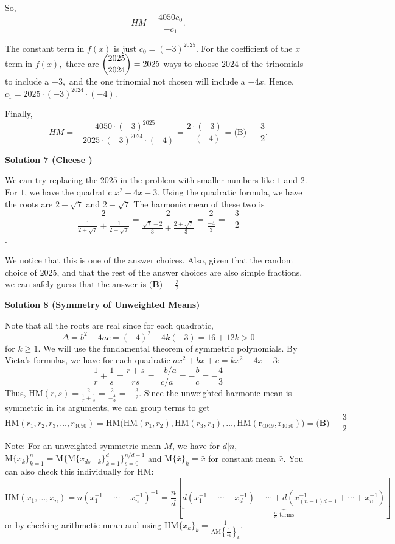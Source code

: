 \begin{enumerate}
 So, 
 \[HM = \dfrac{4050c_0}{-c_1}.\]

 The constant term in $f(x)$ is just $c_0=(-3)^{2025}.$ For the coefficient of the $x$ term in $f(x),$ there are $\dbinom{2025}{2024}=2025$ ways to choose $2024$ of the trinomials to include a $-3,$ and the one trinomial not chosen will include a $-4x.$ Hence, $c_1=2025\cdot (-3)^{2024}\cdot (-4).$

 Finally, 
 \[HM=\dfrac{4050\cdot(-3)^{2025}}{-2025\cdot (-3)^{2024}\cdot (-4)}=\dfrac{2\cdot(-3)}{-(-4)}=\boxed{\text{(B) }-\dfrac{3}{2}}.\]




\textbf{Solution 7 (Cheese )}

We can try replacing the $2025$ in the problem with smaller numbers like $1$ and $2$. For $1$, we have the quadratic $x^2-4x-3$. Using the quadratic formula, we have the roots are $2+\sqrt{7}$ and $2-\sqrt{7}$ The harmonic mean of these two is 
 \[\frac{2}{\frac{1}{2+\sqrt{7}} + \frac{1}{2-\sqrt{7}}}=\frac{2}{\frac{\sqrt{7}-2}{3}+\frac{2+\sqrt{7}}{-3}}=\frac{2}{\frac{-4}{3}}=-\frac{3}{2}\].

 We notice that this is one of the answer choices. Also, given that the random choice of $2025$, and that the rest of the answer choices are also simple fractions, we can safely guess that the answer is $\boxed{\textbf{(B)}~-\frac{3}{2}}$




\textbf{Solution 8 (Symmetry of Unweighted Means)}

Note that all the roots are real since for each quadratic, 
 \[\Delta=b^2-4ac=(-4)^2-4k(-3)=16+12k>0\] for $k\ge 1$. We will use the fundamental theorem of symmetric polynomials. By Vieta's formulas, we have for each quadratic $ax^2+bx+c=kx^2-4x-3$:
 \[\frac{1}{r}+\frac{1}{s}=\frac{r+s}{rs}=\frac{-b/a}{c/a}=-\frac{b}{c}=-\frac{4}{3}\]Thus, $\mathrm{HM}(r,s)=\frac{2}{\frac{1}{r}+\frac{1}{s}}=\frac{2}{-\frac{4}{3}}=-\frac{3}{2}$. Since the unweighted harmonic mean is symmetric in its arguments, we can group terms to get
 \[\mathrm{HM}(r_{1},r_{2},r_{3},\dots,r_{4050})=\mathrm{HM}\bigg(\mathrm{HM}(r_{1},r_{2}),\mathrm{HM}(r_{3},r_{4}),\dots,\mathrm{HM(r_{4049},r_{4050})}\bigg)=\boxed{\textbf{(B)}~-\frac{3}{2}}\]

 Note: For an unweighted symmetric mean $M$, we have for $d|n$, $\mathrm{M}\{ x_{k} \}_{k=1}^{n}=\mathrm{M}\{ \mathrm{M}\{ x_{ds+k} \}_{k=1}^{d} \}_{s=0}^{n/d-1}$ and $\mathrm{M}\{ \bar{x} \}_{k}=\bar{x}$ for constant mean $\bar{x}$. You can also check this individually for HM: 
 \[\mathrm{HM}(x_{1},\dots,x_{n})=n(x_{1}^{-1}+\cdots+x_{n}^{-1})^{-1}=\frac{n}{d}\left[ \underbrace{ d\left(x_{1}^{-1}+\cdots+x_{d}^{-1}\right)+\cdots+d\left(x_{(n-1)d+1}^{-1}+\cdots+x_{n}^{-1}\right) }_{ \frac{n}{d}\text{ terms} } \right]\]or by checking arithmetic mean and using $\mathrm{HM}\{ x_{k} \}_{k}=\frac{1}{\mathrm{AM}\left\{ \frac{1}{x_{k}} \right\}_{k}}$.


\end{enumerate}
